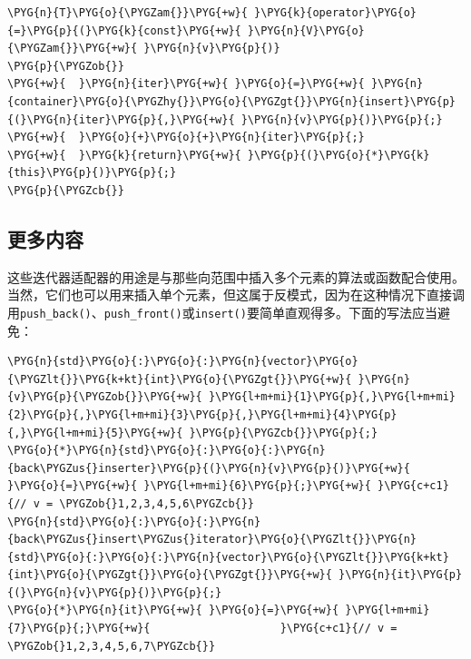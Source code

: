 
\begin{codeblockbg}
\begin{Verbatim}[commandchars=\\\{\},breaklines=true,breakanywhere=true,fontsize=\codefont,xleftmargin=17bp]
\PYG{n}{T}\PYG{o}{\PYGZam{}}\PYG{+w}{ }\PYG{k}{operator}\PYG{o}{=}\PYG{p}{(}\PYG{k}{const}\PYG{+w}{ }\PYG{n}{V}\PYG{o}{\PYGZam{}}\PYG{+w}{ }\PYG{n}{v}\PYG{p}{)}
\PYG{p}{\PYGZob{}}
\PYG{+w}{  }\PYG{n}{iter}\PYG{+w}{ }\PYG{o}{=}\PYG{+w}{ }\PYG{n}{container}\PYG{o}{\PYGZhy{}}\PYG{o}{\PYGZgt{}}\PYG{n}{insert}\PYG{p}{(}\PYG{n}{iter}\PYG{p}{,}\PYG{+w}{ }\PYG{n}{v}\PYG{p}{)}\PYG{p}{;}
\PYG{+w}{  }\PYG{o}{+}\PYG{o}{+}\PYG{n}{iter}\PYG{p}{;}
\PYG{+w}{  }\PYG{k}{return}\PYG{+w}{ }\PYG{p}{(}\PYG{o}{*}\PYG{k}{this}\PYG{p}{)}\PYG{p}{;}
\PYG{p}{\PYGZcb{}}
\end{Verbatim}
\end{codeblockbg}



\subsection{更多内容}



这些迭代器适配器的用途是与那些向范围中插入多个元素的算法或函数配合使用。当然，它们也可以用来插入单个元素，但这属于反模式，因为在这种情况下直接调用\texttt{push\_\allowbreak{}back()}、\texttt{push\_\allowbreak{}front()}或\texttt{insert()}要简单直观得多。下面的写法应当避免：



\begin{codeblockbg}
\begin{Verbatim}[commandchars=\\\{\},breaklines=true,breakanywhere=true,fontsize=\codefont,xleftmargin=17bp]
\PYG{n}{std}\PYG{o}{:}\PYG{o}{:}\PYG{n}{vector}\PYG{o}{\PYGZlt{}}\PYG{k+kt}{int}\PYG{o}{\PYGZgt{}}\PYG{+w}{ }\PYG{n}{v}\PYG{p}{\PYGZob{}}\PYG{+w}{ }\PYG{l+m+mi}{1}\PYG{p}{,}\PYG{l+m+mi}{2}\PYG{p}{,}\PYG{l+m+mi}{3}\PYG{p}{,}\PYG{l+m+mi}{4}\PYG{p}{,}\PYG{l+m+mi}{5}\PYG{+w}{ }\PYG{p}{\PYGZcb{}}\PYG{p}{;}
\PYG{o}{*}\PYG{n}{std}\PYG{o}{:}\PYG{o}{:}\PYG{n}{back\PYGZus{}inserter}\PYG{p}{(}\PYG{n}{v}\PYG{p}{)}\PYG{+w}{ }\PYG{o}{=}\PYG{+w}{ }\PYG{l+m+mi}{6}\PYG{p}{;}\PYG{+w}{ }\PYG{c+c1}{// v = \PYGZob{}1,2,3,4,5,6\PYGZcb{}}
\PYG{n}{std}\PYG{o}{:}\PYG{o}{:}\PYG{n}{back\PYGZus{}insert\PYGZus{}iterator}\PYG{o}{\PYGZlt{}}\PYG{n}{std}\PYG{o}{:}\PYG{o}{:}\PYG{n}{vector}\PYG{o}{\PYGZlt{}}\PYG{k+kt}{int}\PYG{o}{\PYGZgt{}}\PYG{o}{\PYGZgt{}}\PYG{+w}{ }\PYG{n}{it}\PYG{p}{(}\PYG{n}{v}\PYG{p}{)}\PYG{p}{;}
\PYG{o}{*}\PYG{n}{it}\PYG{+w}{ }\PYG{o}{=}\PYG{+w}{ }\PYG{l+m+mi}{7}\PYG{p}{;}\PYG{+w}{                    }\PYG{c+c1}{// v = \PYGZob{}1,2,3,4,5,6,7\PYGZcb{}}
\end{Verbatim}
\end{codeblockbg}


